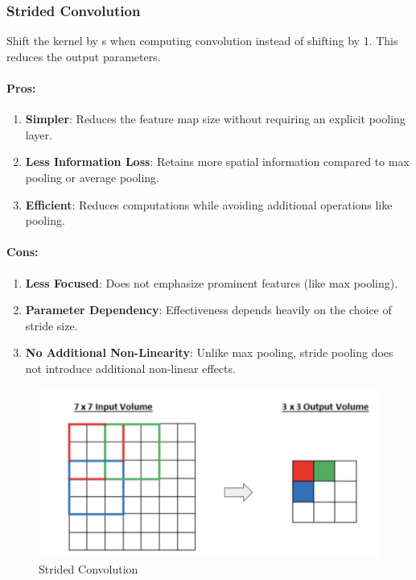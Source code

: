 \documentclass[11pt, english]{article}
\begin{document}
\subsubsection{Strided Convolution}
Shift the kernel by s when computing convolution instead of shifting by 1. This reduces the output parameters.
\paragraph{\textbf{Pros}:}
\begin{enumerate}
    \item \textbf{Simpler}:
Reduces the feature map size without requiring an explicit pooling layer.
    \item \textbf{Less Information Loss}:
Retains more spatial information compared to max pooling or average pooling.
    \item \textbf{Efficient}:
Reduces computations while avoiding additional operations like pooling.

\end{enumerate}
\paragraph{\textbf{Cons}:}
\begin{enumerate}
    \item \textbf{Less Focused}:
Does not emphasize prominent features (like max pooling).
    \item \textbf{Parameter Dependency}:
Effectiveness depends heavily on the choice of stride size.
    \item \textbf{No Additional Non-Linearity}:
Unlike max pooling, stride pooling does not introduce additional non-linear effects.

\end{enumerate}
 
\begin{figure}[H]
    \centering
    \includegraphics[width=0.5\linewidth]{Screenshot 2025-01-28 at 7.46.28 PM.png}
    \caption{Strided Convolution}
    \label{fig:enter-label}
\end{figure}
\end{document}
